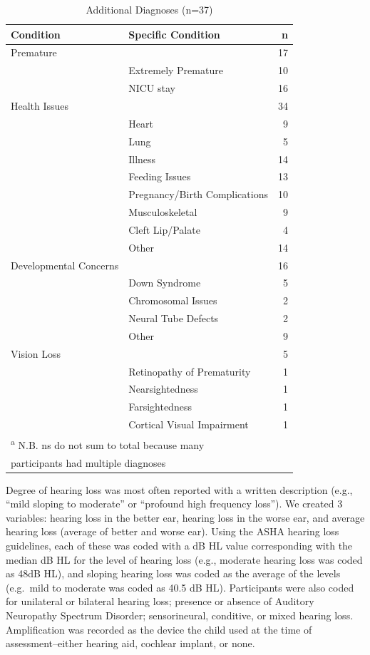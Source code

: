 \documentclass[english,man]{apa6}
\begin{document}
\begin{table}[!h]

\caption{\label{tab:comorbid-info}Additional Diagnoses (n=37)}
\centering
\begin{tabular}[t]{l|l|r}
\hline
Condition & Specific Condition & n\\
\hline
Premature &  & 17\\
\hline
 & Extremely Premature & 10\\
\hline
 & NICU stay & 16\\
\hline
Health Issues &  & 34\\
\hline
 & Heart & 9\\
\hline
 & Lung & 5\\
\hline
 & Illness & 14\\
\hline
 & Feeding Issues & 13\\
\hline
 & Pregnancy/Birth Complications & 10\\
\hline
 & Musculoskeletal & 9\\
\hline
 & Cleft Lip/Palate & 4\\
\hline
 & Other & 14\\
\hline
Developmental Concerns &  & 16\\
\hline
 & Down Syndrome & 5\\
\hline
 & Chromosomal Issues & 2\\
\hline
 & Neural Tube Defects & 2\\
\hline
 & Other & 9\\
\hline
Vision Loss &  & 5\\
\hline
 & Retinopathy of Prematurity & 1\\
\hline
 & Nearsightedness & 1\\
\hline
 & Farsightedness & 1\\
\hline
 & Cortical Visual Impairment & 1\\
\hline
\multicolumn{3}{l}{\textsuperscript{a} N.B. ns do not sum to total because many}\\
\multicolumn{3}{l}{participants had multiple diagnoses}\\
\end{tabular}
\end{table}

Degree of hearing loss was most often reported with a written description (e.g., \enquote{mild sloping to moderate} or \enquote{profound high frequency loss}). We created 3 variables: hearing loss in the better ear, hearing loss in the worse ear, and average hearing loss (average of better and worse ear). Using the ASHA hearing loss guidelines, each of these was coded with a dB HL value corresponding with the median dB HL for the level of hearing loss (e.g., moderate hearing loss was coded as 48dB HL), and sloping hearing loss was coded as the average of the levels (e.g.~mild to moderate was coded as 40.5 dB HL). Participants were also coded for unilateral or bilateral hearing loss; presence or absence of Auditory Neuropathy Spectrum Disorder; sensorineural, conditive, or mixed hearing loss. Amplification was recorded as the device the child used at the time of assessment--either hearing aid, cochlear implant, or none.
\end{document}
